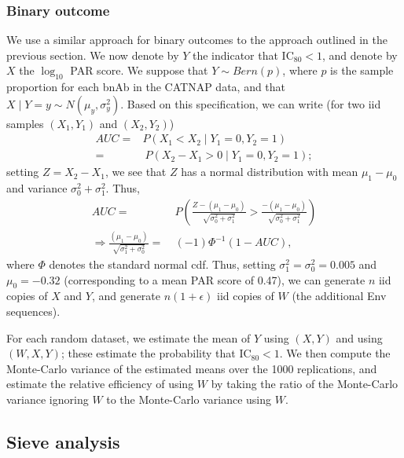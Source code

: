 \documentclass[10pt]{article}
\begin{document}
\subsubsection{Binary outcome}

We use a similar approach for binary outcomes to the approach outlined in the previous section. We now denote by $Y$ the indicator that IC$_{80} < 1$, and denote by $X$ the $\log_{10}$ PAR score. We suppose that $Y \sim Bern(p)$, where $p$ is the sample proportion for each bnAb in the CATNAP data, and that $X \mid Y = y \sim N(\mu_y, \sigma^2_y)$. Based on this specification, we can write (for two iid samples $(X_1, Y_1)$ and $(X_2, Y_2)$)
\begin{align*}
    AUC =& P(X_1 < X_2 \mid Y_1 = 0, Y_2 = 1) \\
    =& \ P(X_2 - X_1 > 0 \mid Y_1 = 0, Y_2 = 1);
\end{align*}
setting $Z = X_2 - X_1$, we see that $Z$ has a normal distribution with mean $\mu_1 - \mu_0$ and variance $\sigma^2_0 + \sigma^2_1$. Thus,
\begin{align*}
    AUC =& \ P(\frac{Z - (\mu_1 - \mu_0)}{\sqrt{\sigma^2_0 + \sigma^2_1}} > \frac{- (\mu_1 - \mu_0)}{\sqrt{\sigma^2_0 + \sigma^2_1}}) \\
    \Rightarrow \frac{(\mu_1 - \mu_0)}{\sqrt{\sigma^2_1 + \sigma^2_0}} =& \ (-1)\Phi^{-1}(1 - AUC),
\end{align*}
where $\Phi$ denotes the standard normal cdf. Thus, setting $\sigma^2_1 = \sigma^2_0 = 0.005$ and $\mu_0 = -0.32$ (corresponding to a mean PAR score of 0.47), we can generate $n$ iid copies of $X$ and $Y$, and generate $n(1 + \epsilon)$ iid copies of $W$ (the additional Env sequences).

For each random dataset, we estimate the mean of $Y$ using $(X,Y)$ and using $(W,X,Y)$; these estimate the probability that IC$_{80} < 1$. We then compute the Monte-Carlo variance of the estimated means over the 1000 replications, and estimate the relative efficiency of using $W$ by taking the ratio of the Monte-Carlo variance ignoring $W$ to the Monte-Carlo variance using $W$.

\subsection{Sieve analysis}
\end{document}
